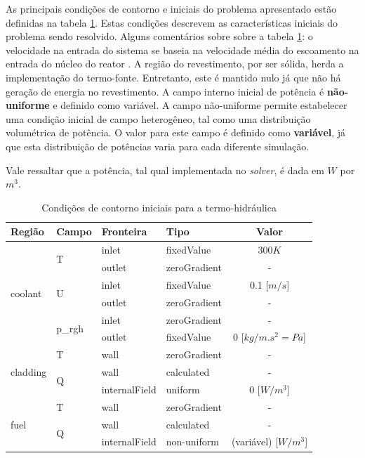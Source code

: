 As principais condições de contorno e iniciais do problema apresentado estão definidas na tabela \ref{tab:cc-init}.
Estas condições descrevem as características iniciais do problema sendo resolvido. Alguns comentários sobre sobre
a tabela \ref{tab:cc-init}: o velocidade na entrada do sistema se baseia na velocidade média do escoamento na
entrada do núcleo do reator \cite{Veloso2005}. A região do revestimento, por ser sólida, herda a implementação
do termo-fonte. Entretanto, este é mantido nulo já que não há geração de energia no revestimento. A campo
interno inicial de potência é \textbf{não-uniforme} e definido como variável. A campo não-uniforme permite estabelecer
uma condição inicial de campo heterogêneo, tal como uma distribuição volumétrica de potência. O valor para este
campo é definido como \textbf{variável}, já que esta distribuição de potências varia para cada diferente simulação.

Vale ressaltar que a potência, tal qual implementada no \textit{solver}, é dada em $W$ por $m^3$.

\begin{table}[htb]
\centering
\caption{Condições de contorno iniciais para a termo-hidráulica}
\label{tab:cc-init}
\begin{tabular}{llllc}
Região                    & Campo                   & Fronteira      & Tipo         & Valor                 \\
\hline
\multirow{6}{*}{coolant}  & \multirow{2}{*}{T}      & inlet         & fixedValue   & $300K$                  \\
                          &                         & outlet        & zeroGradient & -                     \\
                          & \multirow{2}{*}{U}      & inlet         & fixedValue   & 0.1 {[}$m/s${]}         \\
                          &                         & outlet        & zeroGradient & -                     \\
                          & \multirow{2}{*}{p\_rgh} & inlet         & zeroGradient & -                     \\
                          &                         & outlet        & fixedValue   & 0 {[}$kg/m.s^2 = Pa${]}  \\
\hline
\multirow{3}{*}{cladding} & T                       & wall          & zeroGradient & -                     \\
                          & \multirow{2}{*}{Q}      & wall          & calculated   & -                     \\
                          &                         & internalField & uniform      & 0 {[}$W/m^3${]}          \\
\hline
\multirow{3}{*}{fuel}     & T                       & wall          & zeroGradient & -                     \\
                          & \multirow{2}{*}{Q}      & wall          & calculated   & -                     \\
                          &                         & internalField & non-uniform  & (variável) {[}$W/m^3${]}
\end{tabular}
\end{table}

